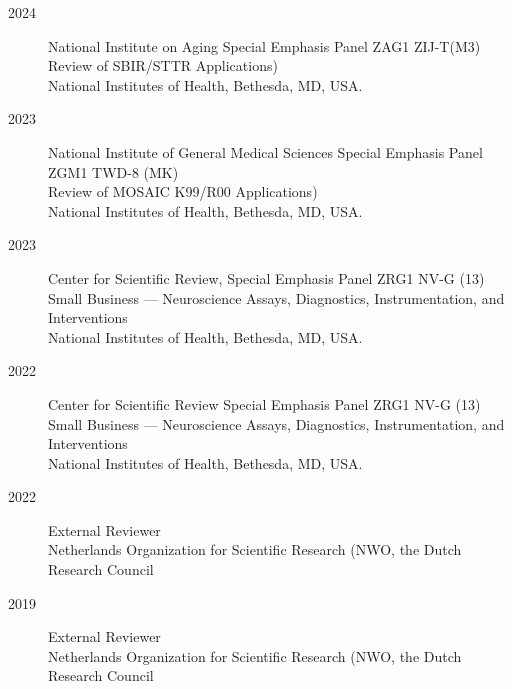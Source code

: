 \begin{description}
\item[2024] National Institute on Aging Special Emphasis Panel ZAG1 ZIJ-T(M3)\\
    Review of SBIR/STTR Applications)\\
    National Institutes of Health, Bethesda, MD, USA. \\
    
\item[2023] National Institute of General Medical Sciences Special Emphasis Panel ZGM1 TWD-8 (MK)\\
    Review of MOSAIC K99/R00 Applications)\\
    National Institutes of Health, Bethesda, MD, USA. \\

\item[2023] Center for Scientific Review, Special Emphasis Panel ZRG1 NV-G (13)\\
    Small Business — Neuroscience Assays, Diagnostics, Instrumentation, and Interventions\\
    National Institutes of Health, Bethesda, MD, USA. \\

\item[2022] Center for Scientific Review Special Emphasis Panel ZRG1 NV-G (13)\\
    Small Business — Neuroscience Assays, Diagnostics, Instrumentation, and Interventions\\
    National Institutes of Health, Bethesda, MD, USA. \\

\item[2022] External Reviewer\\
    Netherlands Organization for Scientific Research (NWO, the Dutch Research Council\\
    
\item[2019] External Reviewer\\
    Netherlands Organization for Scientific Research (NWO, the Dutch Research Council\\
    
    
\end{description}
